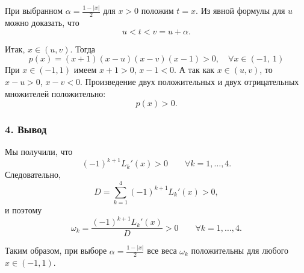 \documentclass[12pt,a4paper]{article}
\begin{document}
	
	При выбранном \(\alpha=\frac{1-|x|}{2}\) для \(x>0\) положим \(t=x\). Из явной формулы для \(u\) можно доказать, что
	\[
	u<t<v=u+\alpha.
	\]
	
	
	\noindent Итак, \(x\in(u,v)\). Тогда
	\[
	p(x)=(x+1)(x-u)(x-v)(x-1) > 0, \quad \forall x \in (-1, \ 1)
	\]
	При \(x\in(-1,1)\) имеем \(x+1>0\), \(x-1<0\). А так как \(x\in(u,v)\), то \(x-u>0\), \(x-v<0\). Произведение двух положительных и двух отрицательных множителей положительно:
	\[
	p(x)>0.
	\]
	
	\subsubsection*{4. Вывод}
	
	Мы получили, что
	\[
	(-1)^{k+1}L_k'(x)>0\qquad \forall k=1,\dots,4.
	\]
	Следовательно,
	\[
	D=\sum_{k=1}^4(-1)^{k+1}L_k'(x)>0,
	\]
	и поэтому
	\[
	\omega_k=\frac{(-1)^{k+1}L_k'(x)}{D}>0\qquad \forall k=1,\dots,4.
	\]
	
	Таким образом, при выборе \(\alpha=\frac{1-|x|}{2}\) все веса \(\omega_k\) положительны для любого \(x\in(-1,1)\).
	
\end{document}

